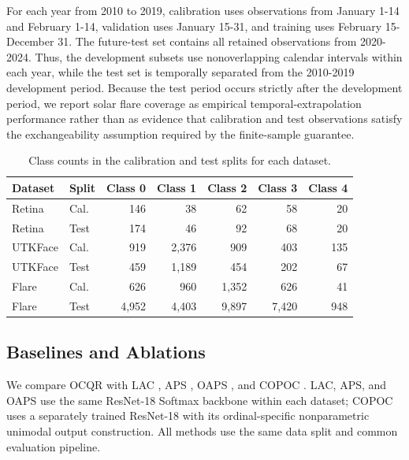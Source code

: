 \documentclass[conference]{IEEEtran}
\begin{document}
For each year from 2010 to 2019, calibration uses observations from January 1-14 and February 1-14, validation uses January 15-31, and training uses February 15-December 31. The future-test set contains all retained observations from 2020-2024. Thus, the development subsets use nonoverlapping calendar intervals within each year, while the test set is temporally separated from the 2010-2019 development period. Because the test period occurs strictly after the development period, we report solar flare coverage as empirical temporal-extrapolation performance rather than as evidence that calibration and test observations satisfy the exchangeability assumption required by the finite-sample guarantee.

\begin{table}[h]
\label{tab:dataset_class_counts}
\caption{Class counts in the calibration and test splits for each dataset.}
\begin{tabular}{llrrrrr}
\toprule
Dataset & Split & Class 0 & Class 1 & Class 2 & Class 3 & Class 4 \\
\midrule
Retina & Cal. & 146 & 38 & 62 & 58 & 20 \\
Retina & Test & 174 & 46 & 92 & 68 & 20 \\
\midrule
UTKFace & Cal. & 919 & 2{,}376 & 909 & 403 & 135 \\
UTKFace & Test & 459 & 1{,}189 & 454 & 202 & 67 \\
\midrule
Flare & Cal. & 626 & 960 & 1{,}352 & 626 & 41  \\
Flare & Test & 4{,}952 & 4{,}403 & 9{,}897 & 7{,}420 & 948  \\
\bottomrule
\end{tabular}
\end{table}

\subsection{Baselines and Ablations}
\label{subsec:baselines}

We compare OCQR with LAC \cite{sadinle2019least}, APS \cite{angelopoulos2020uncertainty,romano2020classification}, OAPS \cite{lu2022oaps}, and COPOC \cite{dey2023copoc}. LAC, APS, and OAPS use the same ResNet-18 Softmax backbone within each dataset; COPOC uses a separately trained ResNet-18 with its ordinal-specific nonparametric unimodal output construction. All methods use the same data split and common evaluation pipeline.
\end{document}
